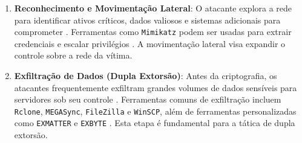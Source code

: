 \begin{enumerate}
    \item \textbf{Reconhecimento e Movimentação Lateral}: O atacante explora a rede para identificar ativos críticos, dados 
    valiosos e sistemas adicionais para comprometer \cite{MasterDCRansomwareHowItWorks, ThreatDownALPHVBlackCat, 
    ResearchGateRansomwareInfectionVector, Casino2025RansomwareDetection}. Ferramentas como \texttt{Mimikatz} podem 
    ser usadas para extrair credenciais e escalar privilégios \cite{WikipediaLockBit}. A movimentação lateral visa expandir 
    o controle sobre a rede da vítima.

    \item \textbf{Exfiltração de Dados (Dupla Extorsão)}: Antes da criptografia, os atacantes frequentemente 
    exfiltram grandes volumes de dados sensíveis para servidores sob seu controle 
    \cite{CyberMaxxRansomwareHistory, Robb2024RansomwareHistory, ThreatDownALPHVBlackCat, MandiantGoogleCloudRansomware2023}. 
    Ferramentas comuns de exfiltração incluem \texttt{Rclone}, \texttt{MEGASync}, \texttt{FileZilla} e \texttt{WinSCP}, além de 
    ferramentas personalizadas como \texttt{EXMATTER} e \texttt{EXBYTE} \cite{MandiantGoogleCloudRansomware2023}. 
    Esta etapa é fundamental para a tática de dupla extorsão.


\end{enumerate}
